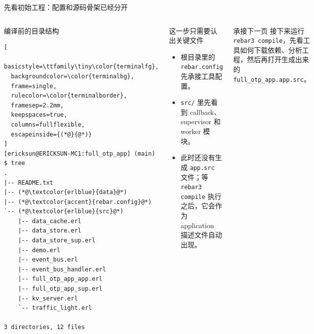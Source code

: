 \documentclass[aspectratio=169, 9pt]{beamer}
\newcommand{\code}[1]{\texttt{#1}}
\begin{document}
\begin{frame}[fragile]{先看初始工程：配置和源码骨架已经分开}
  \begin{columns}[T,onlytextwidth]
    \begin{block}{编译前的目录结构}
\begin{lstlisting}[
  basicstyle=\ttfamily\tiny\color{terminalfg},
  backgroundcolor=\color{terminalbg},
  frame=single,
  rulecolor=\color{terminalborder},
  framesep=2.2mm,
  keepspaces=true,
  columns=fullflexible,
  escapeinside={(*@}{@*)}
]
[ericksun@ERICKSUN-MC1:full_otp_app] (main) $ tree
.
|-- README.txt
|-- (*@\textcolor{erlblue}{data}@*)
|-- (*@\textcolor{accent}{rebar.config}@*)
`-- (*@\textcolor{erlblue}{src}@*)
    |-- data_cache.erl
    |-- data_store.erl
    |-- data_store_sup.erl
    |-- demo.erl
    |-- event_bus.erl
    |-- event_bus_handler.erl
    |-- full_otp_app_app.erl
    |-- full_otp_app_sup.erl
    |-- kv_server.erl
    `-- traffic_light.erl

3 directories, 12 files
\end{lstlisting}
    \end{block}
    \footnotesize
\begin{block}{这一步只需要认出关键文件}
      \begin{itemize}
        \item 根目录里的 \code{rebar.config} 先承接工具配置。
        \item \code{src/} 里先看到 callback、supervisor 和 worker 模块。
        \item 此时还没有生成 \code{app.src} 文件；等 \code{rebar3 compile} 执行之后，它会作为 application 描述文件自动出现。
      \end{itemize}
    \end{block}
    \vspace{0.15cm}
    \begin{exampleblock}{承接下一页}
      接下来运行 \code{rebar3 compile}，先看工具如何下载依赖、分析工程，然后再打开生成出来的 \code{full\_otp\_app.app.src}。
    \end{exampleblock}
  \end{columns}
\end{frame}
\end{document}
